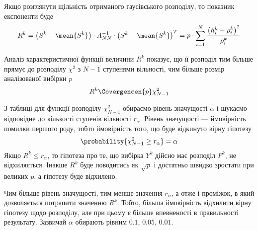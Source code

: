 Якщо розглянути щільність отриманого гаусівського розподілу, то показник
експоненти буде
\begin{equation*}
  R^k
  = \left( S^k - \mean{S^k} \right) \cdot A_{NN}^{-1}
      \cdot \left( S^k - \mean{S^k} \right)^T
  = p \cdot \sum_{i=1}^{N}\frac{\left( h_i^k - \rho_i^k \right)^2}{\rho_i^k}
\end{equation*}
\begin{comment}
Маємо суму $p$ квадратів \textbf{залежних} між собою випадкових величин, що
приблизно мають стандартний гаусовський розподіл.
Хотілося б мати розподіл суми квадратів \textbf{незалежних} стандартних
гаусовських випадкових величин --- розподіл Пірсона $\chi^2$.
Виявляється, що залежність отриманих випадкових величин
забирає лише один ступінь вільності, і на виході отримуємо розподіл Пірсона з
$N-1$ ступенями вільності \cite{Hudson:1963}
\end{comment}
Аналіз характеристичної функції величини $R^k$ показує, що її розподіл тим
більше прямує до розподілу $\chi^2$ з $N-1$ ступенями вільності, чим більше
розмір аналізованої вибірки $p$
\begin{equation*}
  R^k \Covergencen{p} \chi_{N-1}^2
\end{equation*}

З таблиці для функції розподілу $\chi_{N-1}^2$ обираємо рівень значущості
$\alpha$ і шукаємо відповідне до кількості ступенів вільності $r_{\alpha}$.
Рівень значущості --- ймовірність помилки першого роду, тобто ймовірність того,
що буде відкинуто вірну гіпотезу
\begin{equation*}
  \probability{\chi_{N-1}^2 \ge r_{\alpha}} = \alpha
\end{equation*}
Якщо $R^k \le r_{\alpha}$, то гіпотеза про те, що вибірка $Y^k$ дійсно має
розподіл $F^k$, не відхиляється. Інакше $R^k$ буде поводитись як $\sqrt{p}$
і достатньо швидко зростати при великих $p$, а гіпотезу буде відхилено.

Чим більше рівень значущості, тим менше значення $r_{\alpha}$, а отже і
проміжок, в який дозволяється потрапити значенню $R^k$.
Тобто, більша ймовірність відхилити вірну гіпотезу щодо розподілу,
але при цьому є більше впевненості в правильності результату.
Зазвичай $\alpha$ обирають рівним $0.1$, $0.05$, $0.01$.
